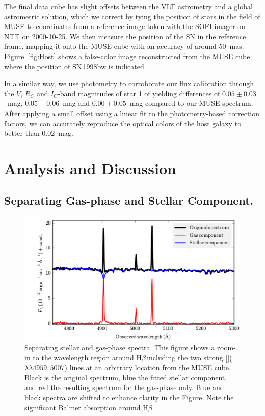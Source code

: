 \documentclass[traditabstract]{aa}
\newcommand{\hb}{H$\beta$}
\newcommand{\oiii}{[\ion{O}{iii}]}
\begin{document}
The final data cube has slight offsets between the VLT astrometry and a global astrometric solution, which we correct by tying the position of stars in the field of MUSE to coordinates from a reference image taken with the SOFI imager on NTT on 2000-10-25. We then measure the position of the SN in the reference frame, mapping it onto the MUSE cube with an accuracy of around 50~mas. Figure~\ref{fig:Host} shows a false-color image reconstructed from the MUSE cube where the position of SN\,1998bw is indicated.

In a similar way, we use photometry to corroborate our flux calibration through the $V$, $R_C$ and $I_C$-band magnitudes of star 1 of \citet{2011AJ....141..163C} yielding differences of $0.05\pm0.03$~mag, $0.05\pm0.06$~mag and $0.00\pm0.05$~mag compared to our MUSE spectrum. After applying a small offset using a linear fit to the photometry-based correction factors, we can accurately reproduce the optical colors of the host galaxy \citep{2005NewA...11..103S} to better than 0.02~mag.


\section{Analysis and Discussion}

\subsection{Separating Gas-phase and Stellar Component.}

\begin{figure}
\includegraphics[angle=0, width=0.99\columnwidth]{Figs/Stargas_spec.pdf}
\caption{Separating stellar and gas-phase spectra. This figure shows a zoom-in to the wavelength region around \hb\,including the two strong \oiii($\lambda\lambda4959,5007$) lines at an arbitrary location from the MUSE cube. Black is the original spectrum, blue the fitted stellar component, and red the resulting spectrum for the gas-phase only. Blue and black spectra are shifted to enhance clarity in the Figure. Note the significant Balmer absorption around \hb.}
\label{fig:stargas}
\end{figure}
\end{document}
